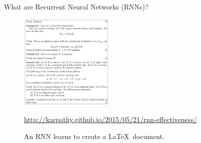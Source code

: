 \documentclass[Nike]{tuberlinbeamer}
\begin{document}
\begin{frame}{What are Recurrent Neural Networks (RNNs)?}
{{	\begin{figure}[h]
			\includegraphics [width=0.4\textwidth]{figures/rnn_effectiveness}
			\caption{An RNN learns to create a \LaTeX \ document.}
			\tiny{\url{http://karpathy.github.io/2015/05/21/rnn-effectiveness/}}
	\end{figure}

	}
}

\end{frame}
\end{document}
